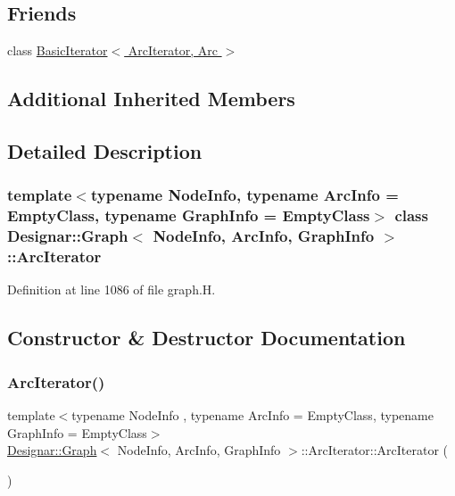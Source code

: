\subsection*{Friends}
\begin{DoxyCompactItemize}
\item 
class \hyperlink{class_designar_1_1_graph_1_1_arc_iterator_a530ad7c7218fa9b74a5cce004d0e3a1c}{Basic\+Iterator$<$ Arc\+Iterator, Arc $>$}
\end{DoxyCompactItemize}
\subsection*{Additional Inherited Members}


\subsection{Detailed Description}
\subsubsection*{template$<$typename Node\+Info, typename Arc\+Info = Empty\+Class, typename Graph\+Info = Empty\+Class$>$\newline
class Designar\+::\+Graph$<$ Node\+Info, Arc\+Info, Graph\+Info $>$\+::\+Arc\+Iterator}



Definition at line 1086 of file graph.\+H.



\subsection{Constructor \& Destructor Documentation}
\mbox{\label{class_designar_1_1_graph_1_1_arc_iterator_a642cf08854577ea29ba520ee882c9d54}} 
\subsubsection{\texorpdfstring{Arc\+Iterator()}{ArcIterator()}\hspace{0.1cm}{\footnotesize\ttfamily [1/5]}}
{\footnotesize\ttfamily template$<$typename Node\+Info , typename Arc\+Info  = Empty\+Class, typename Graph\+Info  = Empty\+Class$>$ \\
\hyperlink{class_designar_1_1_graph}{Designar\+::\+Graph}$<$ Node\+Info, Arc\+Info, Graph\+Info $>$\+::Arc\+Iterator\+::\+Arc\+Iterator (\begin{DoxyParamCaption}{ }\end{DoxyParamCaption})\hspace{0.3cm}{\ttfamily [inline]}}



